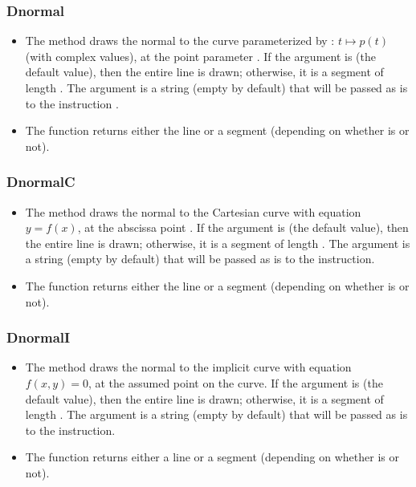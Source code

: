 \subsubsection{Dnormal}
\begin{itemize}
    \item The method  draws the normal to the curve parameterized by : \(t \mapsto p(t)\) (with complex values), at the point parameter . If the argument  is \nil (the default value), then the entire line is drawn; otherwise, it is a segment of length . The argument  is a string (empty by default) that will be passed as is to the instruction \drawcmd.
    \item The function  returns either the line or a segment (depending on whether  is \nil or not).
\end{itemize}

\subsubsection{DnormalC}
\begin{itemize}
    \item The  method draws the normal to the Cartesian curve with equation \(y=f(x)\), at the abscissa point . If the argument  is \nil (the default value), then the entire line is drawn; otherwise, it is a segment of length . The argument  is a string (empty by default) that will be passed as is to the \drawcmd instruction.
    \item The function  returns either the line or a segment (depending on whether  is \nil or not).
\end{itemize}

\subsubsection{DnormalI}
\begin{itemize}
    \item The  method draws the normal to the implicit curve with equation \(f(x,y)=0\), at the assumed point  on the curve. If the  argument is \nil (the default value), then the entire line is drawn; otherwise, it is a segment of length . The  argument is a string (empty by default) that will be passed as is to the \drawcmd instruction.
    \item The function  returns either a line or a segment (depending on whether  is \nil or not).
\end{itemize}

